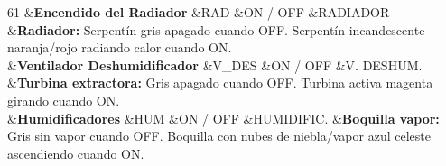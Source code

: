 \begin{DoxyTable}{6}{}{}{1}
  &{\bfseries{Encendido del Radiador}}  &{\ttfamily RAD}  &ON / OFF  &{\ttfamily RADIADOR}  &{\bfseries{Radiador:}} Serpentín gris apagado cuando OFF. Serpentín incandescente naranja/\+rojo radiando calor cuando ON.  \\
  &{\bfseries{Ventilador Deshumidificador}}  &{\ttfamily V\+\_\+\+DES}  &ON / OFF  &{\ttfamily V. DESHUM.}  &{\bfseries{Turbina extractora:}} Gris apagado cuando OFF. Turbina activa magenta girando cuando ON.  \\
  &{\bfseries{Humidificadores}}  &{\ttfamily HUM}  &ON / OFF  &{\ttfamily HUMIDIFIC.}  &{\bfseries{Boquilla vapor:}} Gris sin vapor cuando OFF. Boquilla con nubes de niebla/\+vapor azul celeste ascendiendo cuando ON.  \\
\end{DoxyTable}
